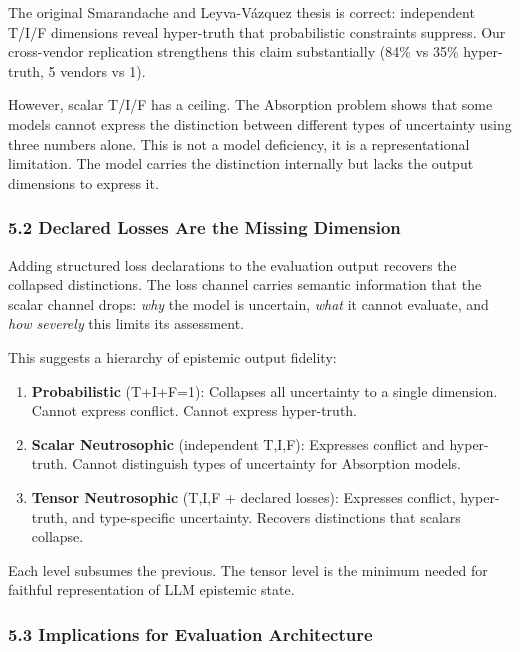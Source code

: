 \documentclass[
]{article}
\providecommand{\tightlist}{%
  \setlength{\itemsep}{0pt}\setlength{\parskip}{0pt}}
\begin{document}
The original Smarandache and Leyva-Vázquez thesis is correct:
independent T/I/F dimensions reveal hyper-truth that probabilistic
constraints suppress. Our cross-vendor replication strengthens this
claim substantially (84\% vs 35\% hyper-truth, 5 vendors vs 1).

However, scalar T/I/F has a ceiling. The Absorption problem shows that
some models cannot express the distinction between different types of
uncertainty using three numbers alone. This is not a model deficiency,
it is a representational limitation. The model carries the distinction
internally but lacks the output dimensions to express it.

\hypertarget{declared-losses-are-the-missing-dimension}{%
\subsubsection{5.2 Declared Losses Are the Missing
Dimension}\label{declared-losses-are-the-missing-dimension}}

Adding structured loss declarations to the evaluation output recovers
the collapsed distinctions. The loss channel carries semantic
information that the scalar channel drops: \emph{why} the model is
uncertain, \emph{what} it cannot evaluate, and \emph{how severely} this
limits its assessment.

This suggests a hierarchy of epistemic output fidelity:

\begin{enumerate}
\def\labelenumi{\arabic{enumi}.}
\tightlist
\item
  \textbf{Probabilistic} (T+I+F=1): Collapses all uncertainty to a
  single dimension. Cannot express conflict. Cannot express hyper-truth.
\item
  \textbf{Scalar Neutrosophic} (independent T,I,F): Expresses conflict
  and hyper-truth. Cannot distinguish types of uncertainty for
  Absorption models.
\item
  \textbf{Tensor Neutrosophic} (T,I,F + declared losses): Expresses
  conflict, hyper-truth, and type-specific uncertainty. Recovers
  distinctions that scalars collapse.
\end{enumerate}

Each level subsumes the previous. The tensor level is the minimum needed
for faithful representation of LLM epistemic state.

\hypertarget{implications-for-evaluation-architecture}{%
\subsubsection{5.3 Implications for Evaluation
Architecture}\label{implications-for-evaluation-architecture}}
\end{document}
